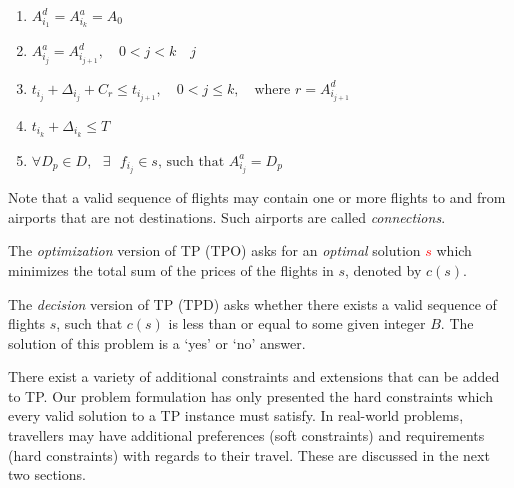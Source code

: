 \documentclass{mprop}
\theoremstyle{definition}
\begin{document}
\begin{enumerate}
\item $A^{d}_{i_{1}} = A^{a}_{i_{k}} = A_{0}$
\item $ A^{a}_{i_{j}} = A^{d}_{i_{j+1}},  \quad 0 < j < k  \quad j$
\item $ t_{i_{j}} + \Delta_{i_{j}} + C_{r} \leq t_{i_{j+1}}, \quad 0 < j \leq k, \quad \textrm{where } r = A^{d}_{i_{j+1}}$
\item $t_{i_{k}} + \Delta_{i_{k}} \leq T$
\item $ \forall D_{p} \in D, \textrm{ } \exists \textrm{ } f_{i_{j}} \in s \textrm{, such that } A^{a}_{i_{j}} = D_{p} $
\end{enumerate}

Note that a valid sequence of flights may contain one or more flights to and from airports that are not destinations. Such airports are called \textit{connections}.


The \textit{optimization} version of TP (TPO) asks for an \textit{optimal} solution \textcolor{red}{$s$} which minimizes the total sum of the prices of the flights in $s$, denoted by $c(s)$.

The \textit{decision} version of TP (TPD) asks whether there exists a valid sequence of flights $s$, such that $c(s)$ is less than or equal to some given integer $B$. The solution of this problem is a `yes' or `no' answer.

There exist a variety of additional constraints and extensions that can be added to TP. Our problem formulation has only presented the hard constraints which every valid solution to a TP instance must satisfy. In real-world problems, travellers may have additional preferences (soft constraints) and requirements (hard constraints) with regards to their travel. These are discussed in the next two sections.
\end{document}
